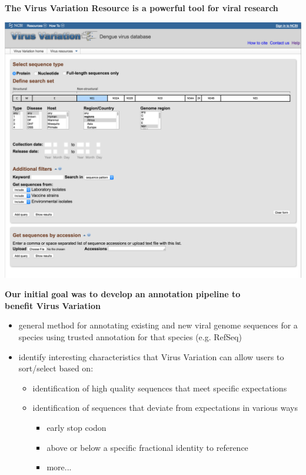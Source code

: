 \documentclass[landscape]{slides}
\begin{document}
\begin{slide}
\begin{center}
\textbf{The Virus Variation Resource is a powerful tool for viral research}

\includegraphics[width=8.5in]{figs/viv-dengue-query}

\vfill
\end{center}
\end{slide}
\begin{slide}
\begin{center}
\textbf{Our initial goal was to develop an annotation pipeline to \\ benefit Virus Variation}

\small
\begin{itemize}
\item general method for annotating existing and new viral genome
  sequences for a species using trusted annotation for that species (e.g. RefSeq)
\item identify interesting characteristics that Virus Variation can
  allow users to sort/select based on:
\begin{itemize}
  \item identification of high quality sequences that meet specific expectations
  \item identification of sequences that deviate from expectations in
    various ways
    \begin{itemize}
      \item early stop codon
      \item above or below a specific fractional identity to reference 
      \item more...
    \end{itemize}
\end{itemize}
\end{itemize}

\end{center}
\vfill
\end{slide}
\end{document}
